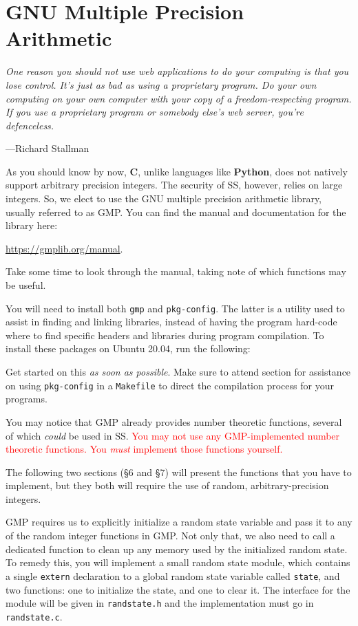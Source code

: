 \section{GNU Multiple Precision Arithmetic}
\epigraph{\emph{One reason you should not use web applications to do your computing is
that you lose control. It's just as bad as using a proprietary program. Do your own
computing on your own computer with your copy of a freedom-respecting program.
If you use a proprietary program or somebody else's web server, you're defenceless.}}{%
---Richard Stallman}

\noindent
As you should know by now, \textbf{C}, unlike languages like
\textbf{Python}, does not natively support arbitrary precision integers.
The security of SS, however, relies on large integers. So, we elect to
use the GNU multiple precision arithmetic library, usually referred to
as GMP\@. You can find the manual and documentation for the library
here:
\centerline{\url{https://gmplib.org/manual}.}
Take some time to look through the manual, taking note of which
functions may be useful.

You will need to install both \texttt{gmp} and \texttt{pkg-config}. The
latter is a utility used to assist in finding and linking libraries,
instead of having the program hard-code where to find specific headers
and libraries during program compilation. To install these packages on
Ubuntu 20.04, run the following:


Get started on this \emph{as soon as possible}. Make sure to attend
section for assistance on using \texttt{pkg-config} in a
\texttt{Makefile} to direct the compilation process for your programs.

You may notice that GMP already provides number theoretic functions,
several of which \emph{could} be used in SS. \textcolor{red}{You may
not use any GMP-implemented number theoretic functions. You \emph{must}
implement those functions yourself.}

The following two sections (\S6 and \S7) will present the functions that
you have to implement, but they both will require the use of random,
arbitrary-precision integers.

GMP requires us to explicitly initialize a random state variable and
pass it to any of the random integer functions in GMP\@. Not only that,
we also need to call a dedicated function to clean up any memory used by
the initialized random state. To remedy this, you will implement a small
random state module, which contains a single \texttt{extern} declaration
to a global random state variable called \texttt{state}, and two
functions: one to initialize the state, and one to clear it. The
interface for the module will be given in \texttt{randstate.h} and the
implementation must go in \texttt{randstate.c}.

